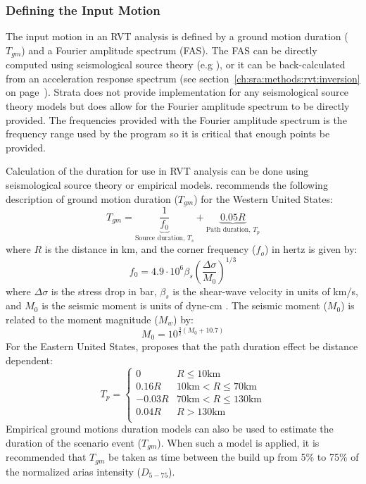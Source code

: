 \documentclass[12pt,oneside]{book}
\begin{document}
\subsubsection{Defining the Input Motion}
The input motion in an RVT analysis is defined by a ground motion duration ($T_{gm}$) and a Fourier
amplitude spectrum (FAS).  The FAS can be directly computed using seismological source theory (e.g
\citep[e.g.][]{brune:70,brune:71}), or it can be back-calculated from an acceleration response
spectrum (see section~\ref{ch:sra:methods:rvt:inversion} on
page~\pageref{ch:sra:methods:rvt:inversion}).  Strata does not provide implementation for
any seismological source theory models but does allow for the Fourier amplitude spectrum to be
directly provided.  The frequencies provided with the Fourier amplitude spectrum is the frequency
range used by the program so it is critical that enough points be provided.

Calculation of the duration for use in RVT analysis can be done using seismological source theory or
empirical models.  \citet{boore:03} recommends the following description of ground motion duration
($T_{gm}$) for the Western United States:
\begin{equation}
    T_{gm} =  \underbrace{\frac{1}{f_0}}_\text{Source duration, $T_s$} + \underbrace{0.05
    R}_\text{Path duration, $T_p$}
\end{equation}
where $R$ is the distance in km, and the corner frequency ($f_o$) in hertz is given by:
\begin{displaymath}
    f_0 = 4.9 \cdot 10^6 \beta_s \left( \frac{\Delta\sigma}{M_0} \right)^{1/3} 
\end{displaymath}
where $\Delta\sigma$ is the stress drop in bar, $\beta_s$ is the shear-wave velocity in units of
km/s, and $M_0$ is the seismic moment is units of dyne-cm \citep{brune:70,brune:71}.  The seismic
moment ($M_0$) is related to the moment magnitude ($M_w$) by:
\begin{displaymath}
    M_0 = 10^{\frac{3}{2}\left( M_0 + 10.7 \right)}
\end{displaymath}
For the Eastern United States, \citet{campbell:03} proposes that the path duration effect be
distance dependent:
\begin{equation}
    T_p = \left\{
        \begin{array}{ll}
            0 & R \le 10 \text{km} \\
            0.16R & 10 \text{km} < R \le 70 \text{km} \\
            -0.03R & 70 \text{km} < R \le 130 \text{km} \\
            0.04R & R > 130 \text{km} \\
        \end{array}
    \right.
\end{equation}
Empirical ground motions duration models \citep[e.g.][]{abrahamson:96} can also be used to estimate the duration of the scenario
event ($T_{gm}$).  When such a model is applied, it is recommended that $T_{gm}$ be taken as time
between the build up from 5\% to 75\% of the normalized arias intensity ($D_{5-75}$).
\end{document}
